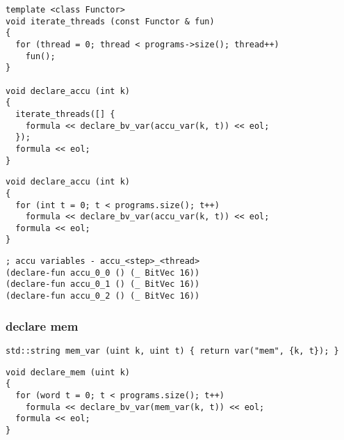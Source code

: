 \begin{lstlisting}[style=c++]
template <class Functor>
void iterate_threads (const Functor & fun)
{
  for (thread = 0; thread < programs->size(); thread++)
    fun();
}

void declare_accu (int k)
{
  iterate_threads([] {
    formula << declare_bv_var(accu_var(k, t)) << eol;
  });
  formula << eol;
}
\end{lstlisting}

\begin{lstlisting}[style=c++]
void declare_accu (int k)
{
  for (int t = 0; t < programs.size(); t++)
    formula << declare_bv_var(accu_var(k, t)) << eol;
  formula << eol;
}
\end{lstlisting}

% 
\begin{lstlisting}[language=SMTLib]
; accu variables - accu_<step>_<thread>
(declare-fun accu_0_0 () (_ BitVec 16))
(declare-fun accu_0_1 () (_ BitVec 16))
(declare-fun accu_0_2 () (_ BitVec 16))
\end{lstlisting}

\subsubsection{declare mem}


\begin{algorithm}[H]
\end{algorithm}

\begin{algorithm}[H]
\end{algorithm}

\begin{lstlisting}[style=c++]
std::string mem_var (uint k, uint t) { return var("mem", {k, t}); }
\end{lstlisting}

\begin{lstlisting}[style=c++]
void declare_mem (uint k)
{
  for (word t = 0; t < programs.size(); t++)
    formula << declare_bv_var(mem_var(k, t)) << eol;
  formula << eol;
}
\end{lstlisting}

